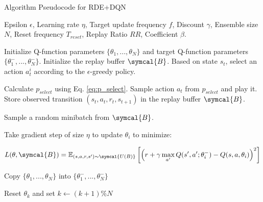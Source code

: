 \documentclass[base]{subfiles}
\begin{document}
\begin{algorithm}
\caption{Algorithm Pseudocode for RDE+DQN}
\label{alg:rde_dqn}
\begin{algorithmic}[1]
\Require Epsilon $\epsilon$, Learning rate $\eta$, Target update frequency $f$, Discount $\gamma$, Ensemble size $N$, Reset frequency $T_{reset}$, Replay Ratio $RR$, Coefficient $\beta$.


\State Initialize Q-function parameters $\{ \theta_1, ..., \theta_N \}$ and target Q-function parameters $\{ \theta_1^{-}, ..., \theta_N^{-} \}$.
\State Initialize the replay buffer $\symcal{B}$.
\State Based on state $s_t$, select an action $a_t^i$ according to the $\epsilon$-greedy policy.
\EndFor

\State Calculate $p_{select}$ using Eq. \ref{eq:p_select}.
\State Sample action $a_t$ from $p_{select}$ and play it.
\State Store observed transition $(s_t, a_t, r_t, s_{t+1})$ in the replay buffer $\symcal{B}$.

\State Sample a random minibatch from $\symcal{B}$.


\State Take gradient step of size $\eta$ to update $\theta_i$ to minimize:

\begin{equation}
\notag
    L(\theta, \symcal{B}) = \mathbb{E}_{(s, a, r, s') \sim \symcal{U(B)}} \left[ \left( r + \gamma \max_{a'} Q(s', a'; \theta_i^{-}) - Q(s, a, \theta_i)  \right)^2 \right]
\end{equation}

\EndFor

    \State Copy $\{ \theta_1, ..., \theta_N \}$ into $\{ \theta_1^{-}, ..., \theta_N^{-} \}$
\EndIf

\EndFor

\State Reset $\theta_k$ and set $k \leftarrow (k+1) \% N$
\EndIf

\EndFor

\EndFor
\end{algorithmic}
\end{algorithm}


\ifSubfilesClassLoaded{%
	\printbibliography
}{}
\end{document}
